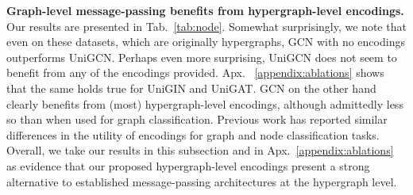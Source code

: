 \noindent \textbf{Graph-level message-passing benefits from hypergraph-level encodings.} Our results are presented in Tab.~\ref{tab:node}. Somewhat surprisingly, we note that even on these datasets, which are originally hypergraphs, GCN with no encodings outperforms UniGCN. Perhaps even more surprising, UniGCN does not seem to benefit from any of the encodings provided. Apx.~ \ref{appendix:ablations} shows that the same holds true for UniGIN and UniGAT. GCN on the other hand clearly benefits from (most) hypergraph-level encodings, although admittedly less so than when used for graph classification. Previous work has reported similar differences in the utility of encodings for graph and node classification tasks. Overall, we take our results in this subsection and in Apx.~\ref{appendix:ablations} as evidence that our proposed hypergraph-level encodings present a strong alternative to established message-passing architectures at the hypergraph level.


